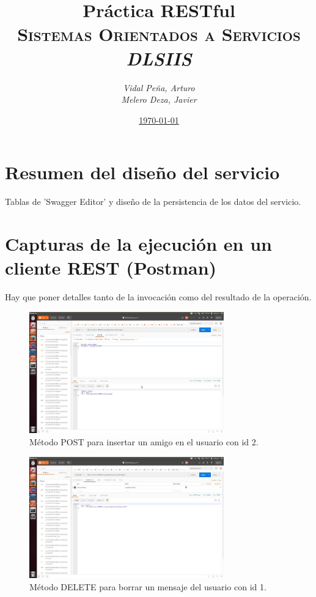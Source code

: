\documentclass[12pt,a4paper, spanish]{article}
\title{\textbf{Práctica RESTful} \\
       \textsc{Sistemas Orientados a Servicios} \\
       \emph{DLSIIS}}
\author{\emph{Vidal Peña, Arturo}\\
        \emph{Melero Deza, Javier}}
\date{\underline{\today}}
\begin{document}
\maketitle
\thispagestyle{empty}
\renewcommand*\contentsname{Índice de contenidos}
\tableofcontents
\pagebreak


\section{Resumen del diseño del servicio}
Tablas de 'Swagger Editor' y diseño de la persistencia de los datos del servicio.

\newpage
\section{Capturas de la ejecución en un cliente REST (Postman)}
Hay que poner detalles tanto de la invocación como del resultado de la operación.

\begin{figure}[H]
	\centering
	\includegraphics[width=0.75\textwidth]{images/captura1.jpg}
	\caption{Método POST para insertar un amigo en el usuario con id 2.}
\end{figure}

\begin{figure}[H]
	\centering
	\includegraphics[width=0.75\textwidth]{images/captura2.jpg}
	\caption{Método DELETE para borrar un mensaje del usuario con id 1.}
\end{figure}
\end{document}
